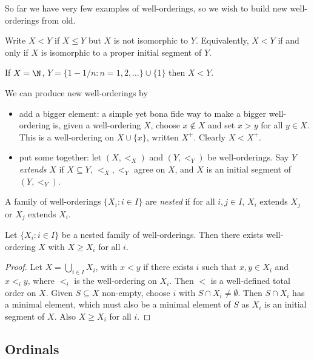 \documentclass[a4paper]{article}
\begin{document}
So far we have very few examples of well-orderings, so we wish to build new well-orderings from old.

\begin{notation}
  Write \(X < Y\) if \(X \leq Y\) but \(X\) is not isomorphic to \(Y\). Equivalently, \(X < Y\) if and only if \(X\) is isomorphic to a proper initial segment of \(Y\).
\end{notation}

\begin{eg}
  If \(X = \N\), \(Y = \{1 - 1/n: n = 1, 2, \dots\} \cup \{1\}\) then \(X < Y\).
\end{eg}

We can produce new well-orderings by
\begin{itemize}
\item add a bigger element: a simple yet bona fide way to make a bigger well-ordering is, given a well-ordering \(X\), choose \(x \notin X\) and set \(x > y\) for all \(y \in X\). This is a well-ordering on \(X \cup \{x\}\), written \(X^+\). Clearly \(X < X^+\).
\item put some together: let \((X, <_X)\) and \((Y, <_Y)\) be well-orderings. Say \(Y\) \emph{extends} \(X\) if \(X \subseteq Y\), \(<_X, <_Y\) agree on \(X\), and \(X\) is an initial segment of \((Y, <_Y)\).
\end{itemize}

A family of well-orderings \(\{X_i: i \in I\}\) are \emph{nested} if for all \(i, j \in I\), \(X_i\) extends \(X_j\) or \(X_j\) extends \(X_i\).

\begin{proposition}
  \label{prop:nested well-orderings}
  Let \(\{X_i: i \in I\}\) be a nested family of well-orderings. Then there exists well-ordering \(X\) with \(X \geq X_i\) for all \(i\).
\end{proposition}

\begin{proof}
  Let \(X = \bigcup_{i \in I} X_i\), with \(x < y\) if there exists \(i\) such that \(x, y \in X_i\) and \(x <_i y\), where \(<_i\) is the well-ordering on \(X_i\). Then \(<\) is a well-defined total order on \(X\). Given \(S \subseteq X\) non-empty, choose \(i\) with \(S \cap X_i \neq \emptyset\). Then \(S \cap X_i\) has a minimal element, which must also be a minimal element of \(S\) as \(X_i\) is an initial segment of \(X\). Also \(X \geq X_i\) for all \(i\).
\end{proof}

\subsection{Ordinals}
\end{document}
